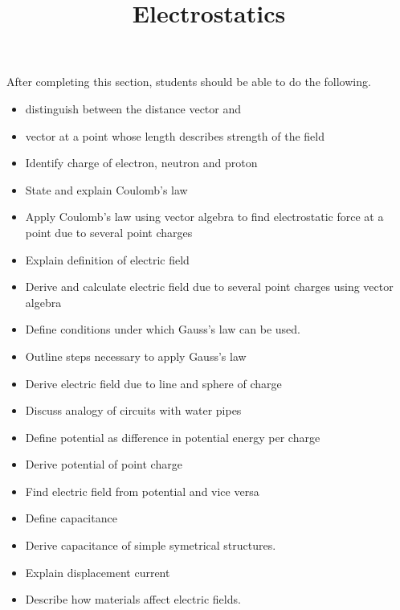 \documentclass{ximera}
\title{Electrostatics}
\begin{document}
\begin{abstract}
\end{abstract}

\maketitle

\begin{sectionOutcomes}

After completing this section, students should be able to do the following.

\begin{itemize}
\item distinguish between the distance vector and 
\item vector at a point whose length describes strength of the field
\item Identify charge of electron, neutron and proton 
\item State and explain Coulomb’s law
\item Apply Coulomb’s law using vector algebra to find electrostatic force at a point due to several point charges
\item Explain definition of electric field
\item Derive and calculate electric field due to several point charges using vector algebra 
\item Define conditions under which Gauss’s law can be used.
\item Outline steps necessary to apply Gauss’s law
\item Derive electric field due to line and sphere of charge
\item Discuss analogy of circuits with water pipes
\item Define potential as difference in potential energy per charge
\item  Derive potential of point charge
\item Find electric field from potential and vice versa
\item Define capacitance
\item Derive capacitance of simple symetrical structures.
\item Explain displacement current
\item Describe how materials affect electric fields.
\end{itemize}

\end{sectionOutcomes}
\end{document}
